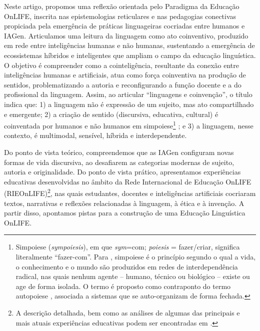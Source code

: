 \documentclass[portuguese]{textolivre}
\begin{document}
Neste artigo, propomos uma reflexão orientada pelo Paradigma da Educação OnLIFE, inscrita nas epistemologias reticulares \cite{difelice2012redessociais} e nas pedagogias conectivas \cite{schlemmer2023protagonismo} propiciada pela emergência de práticas linguageiras cocriadas entre humanos e IAGen. Articulamos uma leitura da linguagem como ato coinventivo, produzido em rede entre inteligências humanas e não humanas, sustentando a emergência de ecossistemas híbridos e inteligentes que ampliam o campo da educação linguística. O objetivo é compreender como a cointeligência, resultante da conexão entre inteligências humanas e artificiais, atua como força coinventiva na produção de sentidos, problematizando a autoria e reconfigurando a função docente e a do profissional da linguagem. Assim, ao articular “linguagens e coinvenção”, o título indica que: 1) a linguagem não é expressão de um sujeito, mas ato compartilhado e emergente; 2) a criação de sentido (discursiva, educativa, cultural) é coinventada por humanos e não humanos em simpoiese\footnote{Simpoiese (\textit{sympoiesis}), em que \textit{sym}=com; \textit{poiesis} = fazer/criar, significa literalmente “fazer-com”. Para \textcite{haraway2016staying}, simpoiese é o princípio segundo o qual a vida, o conhecimento e o mundo são produzidos em redes de interdependência radical, nas quais nenhum agente – humano, técnico ou biológico – existe ou age de forma isolada. O termo é proposto como contraponto do termo autopoiese \cite{maturana1980autopoiesis}, associada a sistemas que se auto-organizam de forma fechada.} \cite{haraway2016staying}; e  3) a linguagem, nesse contexto, é multimodal, sensível, híbrida e interdependente.

Do ponto de vista teórico, compreendemos que as IAGen configuram novas formas de vida discursiva, ao desafiarem as categorias modernas de sujeito, autoria e originalidade. Do ponto de vista prático, apresentamos experiências educativas desenvolvidas no âmbito da Rede Internacional de Educação OnLIFE (RIEOnLIFE)\footnote{A descrição detalhada, bem como as análises de algumas das principais e mais atuais experiências educativas podem ser encontradas em \textcite{schell2024tomkat,schlemmer2024universidade,thomazzoni2024vivencia,schell2025narrativas,schell2025doctoral}.}, nas quais estudantes, docentes e inteligências artificiais cocriaram textos, narrativas e reflexões relacionadas à linguagem, à ética e à invenção. A partir disso, apontamos pistas para a construção de uma Educação Linguística OnLIFE.
\end{document}
